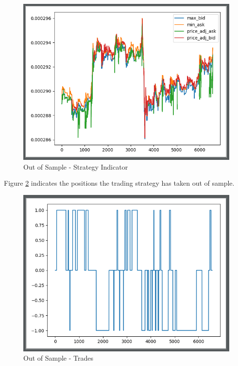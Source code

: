 \documentclass[12pt]{article}
\begin{document}
\begin{figure}[h!]
	\centering
  \includegraphics[scale=0.4]{os_trading.png}
  \caption{Out of Sample - Strategy Indicator}
  \label{fig:osstrategy}
\end{figure}
\FloatBarrier
Figure \ref{fig:ostrades} indicates the positions the trading strategy has taken out of sample.

\begin{figure}[h!]
	\centering
  \includegraphics[scale=0.4]{os_trades.png}
  \caption{Out of Sample - Trades}
  \label{fig:ostrades}
\end{figure}
\FloatBarrier
\end{document}
